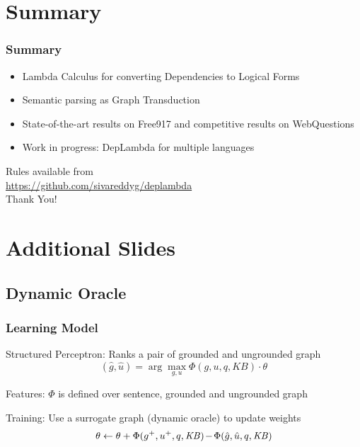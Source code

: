 \documentclass[mathserif,12pt]{beamer}
\newcommand{\hlight}[1]{{\color{blue!80} #1}}
\newcommand \free{Free917\xspace}
\newcommand \webq{WebQuestions\xspace}
\begin{document}
\section{Summary}
\begin{frame}
\frametitle{Summary}
\begin{itemize}
 \item Lambda Calculus for converting Dependencies to Logical Forms
 
 \vspace{1em} 
 \item Semantic parsing as Graph Transduction

 \vspace{1em}
 \item State-of-the-art results on \free and competitive results on \webq
 
 \pause
 \vspace{1em}
 \item Work in progress: DepLambda for multiple languages
\end{itemize}

\pause
\begin{center}Rules available from\\ \hlight{\url{https://github.com/sivareddyg/deplambda}} \\
Thank You!
\end{center}
\end{frame}

\section{Additional Slides}

\subsection{Dynamic Oracle}
\begin{frame}[noframenumbering]
\frametitle{Learning Model}

\hlight{Structured Perceptron:} Ranks a pair of
grounded and ungrounded graph $$(\hat{g},\hat{u}) = \arg\max\limits_{g,u}
                        \Phi(g,u,q,\mathit{KB}) \cdot \theta$$

\pause

\vspace{0.5cm}
\hlight{Features:} $\Phi$ is defined over sentence, grounded and
ungrounded graph

\vspace{1cm}

\pause
\hlight{Training:} Use a surrogate graph (dynamic oracle) to update weights 
$$\theta \leftarrow \theta +
\Phi(g^+,u^+,q,\mathit{KB})\hspace{-.3ex}-\hspace{-.3ex}\Phi(\hat{g},\hat{u},q,\mathit{KB})$$


\end{frame}
\end{document}
